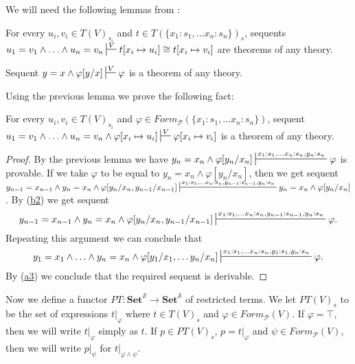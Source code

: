 \documentclass[reqno]{amsart}
\newcommand{\axref}[1]{(\hyperref[ax:#1]{#1})}
\theoremstyle{definition}
\theoremstyle{remark}
\newcommand{\cat}[1]{\mathbf{#1}}
\newcommand{\Set}{\cat{Set}}
\numberwithin{figure}{section}
\begin{document}
We will need the following lemmas from \cite{PHL}:
\begin{lem}[cong-a]
For every $u_i,v_i \in T(V)_{s_i}$ and $t \in T(\{ x_1 : s_1, \ldots x_n : s_n\})_s$,
sequents $u_1 = v_1 \land \ldots \land u_n = v_n \sststile{}{V} t[x_i \mapsto u_i] \cong t[x_i \mapsto v_i]$ are theorems of any theory.
\end{lem}

\begin{lem}
Sequent $y = x \land \varphi[y/x] \sststile{}{V} \varphi$ is a theorem of any theory.
\end{lem}

Using the previous lemma we prove the following fact:

\begin{lem}[cong-b]
For every $u_i,v_i \in T(V)_{s_i}$ and $\varphi \in Form_\mathcal{P}(\{ x_1 : s_1, \ldots x_n : s_n\})$,
sequent $u_1 = v_1 \land \ldots \land u_n = v_n \land \varphi[x_i \mapsto u_i] \sststile{}{V} \varphi[x_i \mapsto v_i]$ is a theorem of any theory.
\end{lem}
\begin{proof}
By the previous lemma we have $y_n = x_n \land \varphi[y_n/x_n] \sststile{}{x_1 : s_1, \ldots x_n : s_n, y_n : s_n} \varphi$ is provable.
If we take $\varphi$ to be equal to $y_n = x_n \land \varphi[y_n/x_n]$, then we get sequent
$y_{n-1} = x_{n-1} \land y_n = x_n \land \varphi[y_n/x_n,y_{n-1}/x_{n-1}] \sststile{}{x_1 : s_1, \ldots x_n : s_n, y_{n-1} : s_{n-1}, y_n : s_n} y_n = x_n \land \varphi[y_n/x_n]$.
By \axref{b2} we get sequent
\[ y_{n-1} = x_{n-1} \land y_n = x_n \land \varphi[y_n/x_n,y_{n-1}/x_{n-1}] \sststile{}{x_1 : s_1, \ldots x_n : s_n, y_{n-1} : s_{n-1}, y_n : s_n} \varphi. \]
Repeating this argument we can conclude that
\[ y_1 = x_1 \land \ldots \land y_n = x_n \land \varphi[y_1/x_1, \ldots y_n/x_n] \sststile{}{x_1 : s_1, \ldots x_n : s_n, y_1 : s_1, y_n : s_n} \varphi. \]
By \axref{a3} we conclude that the required sequent is derivable.
\end{proof}

Now we define a functor $PT : \Set^\mathcal{S} \to \Set^\mathcal{S}$ of restricted terms.
We let $PT(V)_s$ to be the set of expressions $t|_\varphi$ where $t \in T(V)_s$ and $\varphi \in Form_\mathcal{P}(V)$.
If $\varphi = \top$, then we will write $t|_\varphi$ simply as $t$.
If $p \in PT(V)_s$, $p = t|_\varphi$ and $\psi \in Form_\mathcal{P}(V)$, then we will write $p|_\psi$ for $t|_{\varphi \land \psi}$.
\end{document}
